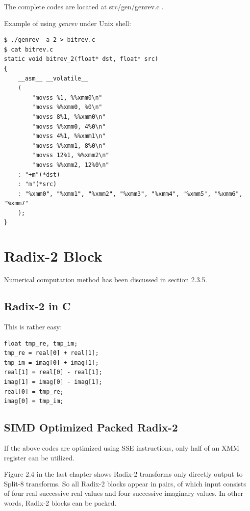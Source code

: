 \documentclass[a4paper]{report}
\begin{document}
	The complete codes are located at src/gen/genrev.c .
	
	Example of using \textit{genrev} under Unix shell:

        \lstset{language = sh, tabsize = 4}
        \begin{lstlisting}
$ ./genrev -a 2 > bitrev.c
$ cat bitrev.c
static void bitrev_2(float* dst, float* src)
{
    __asm__ __volatile__
    (
        "movss %1, %%xmm0\n"
        "movss %%xmm0, %0\n"
        "movss 8%1, %%xmm0\n"
        "movss %%xmm0, 4%0\n"
        "movss 4%1, %%xmm1\n"
        "movss %%xmm1, 8%0\n"
        "movss 12%1, %%xmm2\n"
        "movss %%xmm2, 12%0\n"
    : "+m"(*dst)
    : "m"(*src)
    : "%xmm0", "%xmm1", "%xmm2", "%xmm3", "%xmm4", "%xmm5", "%xmm6", "%xmm7"
    );
}
        \end{lstlisting}

\section{Radix-2 Block} \indent

	Numerical computation method has been discussed in section 2.3.5.

\subsection{Radix-2 in C} \indent

	This is rather easy:
	
    \lstset{language = c, tabsize = 4}
    \begin{lstlisting}
float tmp_re, tmp_im;
tmp_re = real[0] + real[1];
tmp_im = imag[0] + imag[1];
real[1] = real[0] - real[1];
imag[1] = imag[0] - imag[1];
real[0] = tmp_re;
imag[0] = tmp_im;
    \end{lstlisting}

\subsection{SIMD Optimized Packed Radix-2} \indent

	If the above codes are optimized using SSE instructions, only half of an XMM register can be utilized.
	
	Figure 2.4 in the last chapter shows Radix-2 transforms only directly output to Split-8 transforms. So all Radix-2 blocks appear in pairs, of which input consists of four real successive real values and four successive imaginary values. In other words, Radix-2 blocks can be packed.
\end{document}
